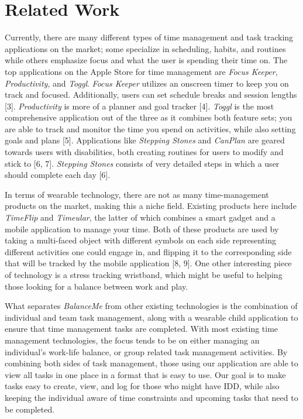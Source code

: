 \documentclass{sigchi}
\begin{document}
\section{Related Work}

Currently, there are many different types of time management and task tracking
applications on the market; some specialize in scheduling, habits, and routines
while others emphasize focus and what the user is spending their time on. The
top applications on the Apple Store for time management are
\textit{Focus Keeper}, \textit{Productivity}, and \textit{Toggl}.
\textit{Focus Keeper} utilizes an onscreen timer to keep you on track and
focused. Additionally, users can set schedule breaks and session lengths [3].
\textit{Productivity} is more of a planner and goal tracker [4]. \textit{Toggl}
is the most comprehensive application out of the three as it combines both
feature sets; you are able to track and monitor the time you spend on
activities, while also setting goals and plans [5]. Applications like
\textit{Stepping Stones} and \textit{CanPlan} are geared towards users with
disabilities, both creating routines for users to modify and stick to [6, 7].
\textit{Stepping Stones} consists of very detailed steps in which a user should
complete each day [6].

In terms of wearable technology, there are not as many time-management products
on the market, making this a niche field. Existing products here include
\textit{TimeFlip} and \textit{Timeular}, the latter of which combines a smart
gadget and a mobile application to manage your time. Both of these products are
used by taking a multi-faced object with different symbols on each side
representing different activities one could engage in, and flipping it to the
corresponding side that will be tracked by the mobile application [8, 9]. One
other interesting piece of technology is a stress tracking wristband, which
might be useful to helping those looking for a balance between work and play.

What separates \textit{BalanceMe} from other existing technologies is the
combination of individual and team task management, along with a wearable
child application to ensure that time management tasks are completed. With
most existing time management technologies, the focus tends to be on either
managing an individual’s work-life balance, or group related task management
activities. By combining both sides of task management, those using our
application are able to view all tasks in one place in a format that is easy to
use. Our goal is to make tasks easy to create, view, and log for those who
might have IDD, while also keeping the individual aware of time constraints and
upcoming tasks that need to be completed.
\end{document}
